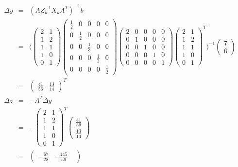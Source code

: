 \documentclass[a4paper,11pt]{jsarticle}
\numberwithin{theorem}{section}  %
\numberwithin{equation}{section} %
\begin{document}
\begin{eqnarray*}
\Delta y&=& (AZ_k^{-1}X_kA^T)^{-1}b\\
&=& \Biggr(
\begin{pmatrix}
2&1\\ 1&2\\ 1&1\\ 1&0\\ 0&1
\end{pmatrix}
\begin{pmatrix}
\frac{1}{2} & 0 & 0 & 0 & 0\\
0 & \frac{1}{2} & 0 & 0 & 0\\
0 & 0 & \frac{1}{3} & 0 & 0\\
0 & 0 & 0 & \frac{1}{2} & 0\\
0 & 0 & 0 & 0 & \frac{1}{2}
\end{pmatrix}
\begin{pmatrix}
2 & 0 & 0 & 0 & 0\\
0 & 1 & 0 & 0 & 0\\
0 & 0 & 1 & 0 & 0\\
0 & 0 & 0 & 1 & 0\\
0 & 0 & 0 & 0 & 1
\end{pmatrix}
\begin{pmatrix}
2&1\\ 1&2\\ 1&1\\ 1&0\\ 0&1
\end{pmatrix}^T
\Biggr)^{-1} \begin{pmatrix}
7\\6
\end{pmatrix}\\
&=& \begin{pmatrix}\frac{41}{56} & \frac{13}{14}\end{pmatrix}^T\\
\Delta z&=& -A^T\Delta y\\
&=& -
\begin{pmatrix}
2&1\\ 1&2\\ 1&1\\ 1&0\\ 0&1
\end{pmatrix}^T
\begin{pmatrix}
\frac{41}{56}\\\frac{13}{14}
\end{pmatrix}
\\
&=& \begin{pmatrix}
-\frac{67}{28}&
-\frac{145}{56}&

\end{pmatrix}
\end{eqnarray*}
\end{document}
